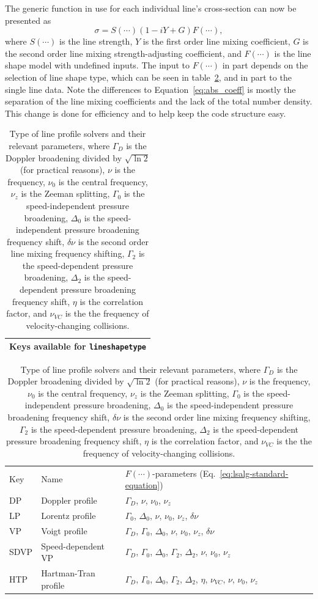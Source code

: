 The generic function in use for each individual line's cross-section can now be presented as
\begin{equation}
 \sigma = S(\cdots) \left(1 - iY + G\right) F\left( \cdots \right),
 \label{eq:lsalg-standard-equation}
\end{equation}
where
$S(\cdots)$ is the line strength,
$Y$ is the first order line mixing coefficient,
$G$ is the second order line mixing strength-adjusting coefficient, and
$F(\cdots)$ is the line shape model with undefined inputs.
The input to $F(\cdots)$ in part depends
on the selection of line shape type, which can be seen in table~\ref{tab:abs_theory:lineshape:lineshapetype},
and in part to the single line data.  Note the differences
to Equation~\ref{eq:abs_coeff} is mostly the separation of the line mixing
coefficients and the lack of the total number density.
This change is done for efficiency and to help keep the code structure easy.

\begin{table}[ht!]
 \centering
 \begin{tabular}{c}
  Keys available for \verb|lineshapetype|\\\hline
 \end{tabular}
 \begin{tabular}{lll}
  Key&Name&$F(\cdots)$-parameters (Eq.~\ref{eq:lsalg-standard-equation})\\
  DP&Doppler profile&$\Gamma_D$, $\nu$, $\nu_0$, $\nu_z$\\[5pt]
  LP&Lorentz profile&$\Gamma_0$, $\Delta_0$, $\nu$, $\nu_0$, $\nu_z$, $\delta\nu$\\[5pt]
  VP&Voigt profile&$\Gamma_D$, $\Gamma_0$, $\Delta_0$, $\nu$, $\nu_0$, $\nu_z$, $\delta\nu$\\[5pt]
  SDVP&Speed-dependent VP&$\Gamma_D$, $\Gamma_0$, $\Delta_0$, $\Gamma_2$, $\Delta_2$, $\nu$, $\nu_0$, $\nu_z$\\[5pt]
  HTP&Hartman-Tran profile&$\Gamma_D$, $\Gamma_0$, $\Delta_0$, $\Gamma_2$, $\Delta_2$, $\eta$, $\nu_{VC}$, $\nu$, $\nu_0$, $\nu_z$
 \end{tabular}
 \caption{Type of line profile solvers and their relevant parameters, where
 $\Gamma_D$ is the Doppler broadening divided by $\sqrt{\ln 2}$ (for practical reasons),
 $\nu$ is the frequency,
 $\nu_0$ is the central frequency,
 $\nu_z$ is the Zeeman splitting,
 $\Gamma_0$ is the speed-independent pressure broadening,
 $\Delta_0$ is the speed-independent pressure broadening frequency shift,
 $\delta\nu$ is the second order line mixing frequency shifting,
 $\Gamma_2$ is the speed-dependent pressure broadening,
 $\Delta_2$ is the speed-dependent pressure broadening frequency shift,
 $\eta$ is the correlation factor, and
 $\nu_{VC}$ is the the frequency of velocity-changing collisions.
 }
 \label{tab:abs_theory:lineshape:lineshapetype}
\end{table}

